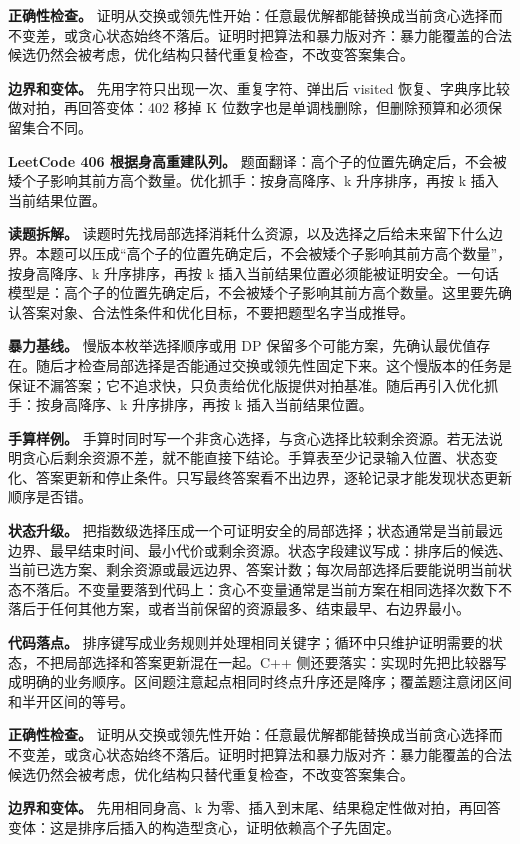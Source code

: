 \textbf{正确性检查。} 证明从交换或领先性开始：任意最优解都能替换成当前贪心选择而不变差，或贪心状态始终不落后。证明时把算法和暴力版对齐：暴力能覆盖的合法候选仍然会被考虑，优化结构只替代重复检查，不改变答案集合。

\textbf{边界和变体。} 先用字符只出现一次、重复字符、弹出后 visited 恢复、字典序比较做对拍，再回答变体：402 移掉 K 位数字也是单调栈删除，但删除预算和必须保留集合不同。

\noindent\textbf{LeetCode 406 根据身高重建队列。} 题面翻译：高个子的位置先确定后，不会被矮个子影响其前方高个数量。优化抓手：按身高降序、k 升序排序，再按 k 插入当前结果位置。

\textbf{读题拆解。} 读题时先找局部选择消耗什么资源，以及选择之后给未来留下什么边界。本题可以压成“高个子的位置先确定后，不会被矮个子影响其前方高个数量”，按身高降序、k 升序排序，再按 k 插入当前结果位置必须能被证明安全。一句话模型是：高个子的位置先确定后，不会被矮个子影响其前方高个数量。这里要先确认答案对象、合法性条件和优化目标，不要把题型名字当成推导。

\textbf{暴力基线。} 慢版本枚举选择顺序或用 DP 保留多个可能方案，先确认最优值存在。随后才检查局部选择是否能通过交换或领先性固定下来。这个慢版本的任务是保证不漏答案；它不追求快，只负责给优化版提供对拍基准。随后再引入优化抓手：按身高降序、k 升序排序，再按 k 插入当前结果位置。

\textbf{手算样例。} 手算时同时写一个非贪心选择，与贪心选择比较剩余资源。若无法说明贪心后剩余资源不差，就不能直接下结论。手算表至少记录输入位置、状态变化、答案更新和停止条件。只写最终答案看不出边界，逐轮记录才能发现状态更新顺序是否错。

\textbf{状态升级。} 把指数级选择压成一个可证明安全的局部选择；状态通常是当前最远边界、最早结束时间、最小代价或剩余资源。状态字段建议写成：排序后的候选、当前已选方案、剩余资源或最远边界、答案计数；每次局部选择后要能说明当前状态不落后。不变量要落到代码上：贪心不变量通常是当前方案在相同选择次数下不落后于任何其他方案，或者当前保留的资源最多、结束最早、右边界最小。

\textbf{代码落点。} 排序键写成业务规则并处理相同关键字；循环中只维护证明需要的状态，不把局部选择和答案更新混在一起。C++ 侧还要落实：实现时先把比较器写成明确的业务顺序。区间题注意起点相同时终点升序还是降序；覆盖题注意闭区间和半开区间的等号。

\textbf{正确性检查。} 证明从交换或领先性开始：任意最优解都能替换成当前贪心选择而不变差，或贪心状态始终不落后。证明时把算法和暴力版对齐：暴力能覆盖的合法候选仍然会被考虑，优化结构只替代重复检查，不改变答案集合。

\textbf{边界和变体。} 先用相同身高、k 为零、插入到末尾、结果稳定性做对拍，再回答变体：这是排序后插入的构造型贪心，证明依赖高个子先固定。

